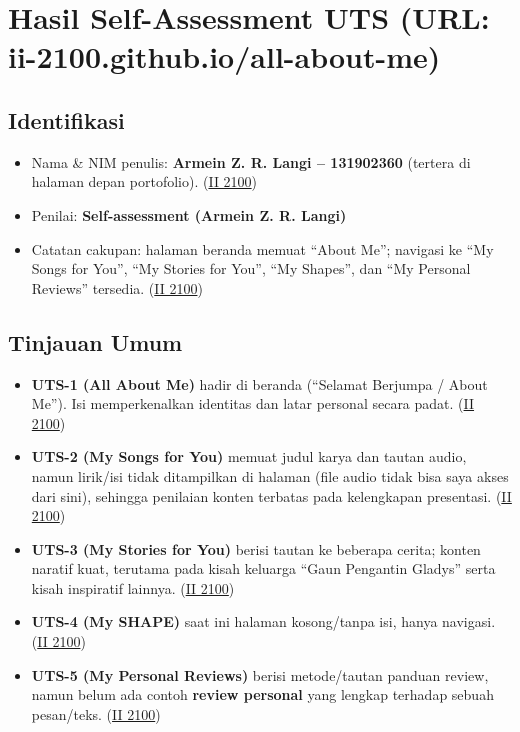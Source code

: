 \documentclass[
  letterpaper,
  DIV=11,
  numbers=noendperiod]{scrreprt}
\providecommand{\tightlist}{%
  \setlength{\itemsep}{0pt}\setlength{\parskip}{0pt}}
\begin{document}

\chapter{Hasil Self-Assessment UTS (URL:
ii-2100.github.io/all-about-me)}\label{hasil-self-assessment-uts-url-ii-2100.github.ioall-about-me}

\section{Identifikasi}\label{identifikasi}

\begin{itemize}
\tightlist
\item
  Nama \& NIM penulis: \textbf{Armein Z. R. Langi -- 131902360} (tertera
  di halaman depan portofolio).
  (\href{https://ii-2100.github.io/all-about-me/}{II 2100})
\item
  Penilai: \textbf{Self-assessment (Armein Z. R. Langi)}
\item
  Catatan cakupan: halaman beranda memuat ``About Me''; navigasi ke ``My
  Songs for You'', ``My Stories for You'', ``My Shapes'', dan ``My
  Personal Reviews'' tersedia.
  (\href{https://ii-2100.github.io/all-about-me/}{II 2100})
\end{itemize}

\section{Tinjauan Umum}\label{tinjauan-umum}

\begin{itemize}
\tightlist
\item
  \textbf{UTS-1 (All About Me)} hadir di beranda (``Selamat Berjumpa /
  About Me''). Isi memperkenalkan identitas dan latar personal secara
  padat. (\href{https://ii-2100.github.io/all-about-me/}{II 2100})
\item
  \textbf{UTS-2 (My Songs for You)} memuat judul karya dan tautan audio,
  namun lirik/isi tidak ditampilkan di halaman (file audio tidak bisa
  saya akses dari sini), sehingga penilaian konten terbatas pada
  kelengkapan presentasi.
  (\href{https://ii-2100.github.io/all-about-me/My_Song_for_You/index.html}{II
  2100})
\item
  \textbf{UTS-3 (My Stories for You)} berisi tautan ke beberapa cerita;
  konten naratif kuat, terutama pada kisah keluarga ``Gaun Pengantin
  Gladys'' serta kisah inspiratif lainnya.
  (\href{https://ii-2100.github.io/all-about-me/My_Stories_for_You/index.html}{II
  2100})
\item
  \textbf{UTS-4 (My SHAPE)} saat ini halaman kosong/tanpa isi, hanya
  navigasi.
  (\href{https://ii-2100.github.io/all-about-me/My_Shapes/index.html}{II
  2100})
\item
  \textbf{UTS-5 (My Personal Reviews)} berisi metode/tautan panduan
  review, namun belum ada contoh \textbf{review personal} yang lengkap
  terhadap sebuah pesan/teks.
  (\href{https://ii-2100.github.io/all-about-me/My_Personal_Reviews/index.html}{II
  2100})
\end{itemize}
\end{document}
